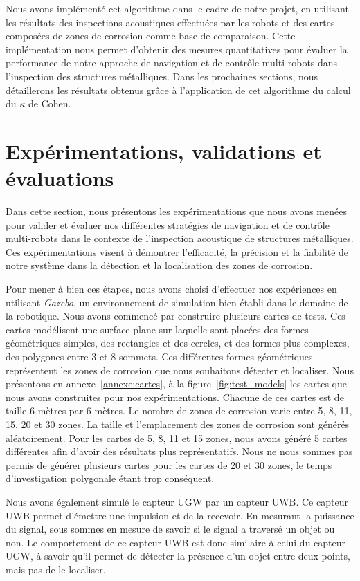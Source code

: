 \documentclass[francais,RandD]{rapportPFE}
\begin{document}
			Nous avons implémenté cet algorithme dans le cadre de notre projet, en utilisant les résultats des inspections acoustiques effectuées par les robots et des cartes composées de zones de corrosion comme base de comparaison.
			Cette implémentation nous permet d'obtenir des mesures quantitatives pour évaluer la performance de notre approche de navigation et de contrôle multi-robots dans l'inspection des structures métalliques.
			Dans les prochaines sections, nous détaillerons les résultats obtenus grâce à l'application de cet algorithme du calcul du $\kappa$ de Cohen.
	\section{Expérimentations, validations et évaluations}
		Dans cette section, nous présentons les expérimentations que nous avons menées pour valider et évaluer nos différentes stratégies de navigation et de contrôle multi-robots dans le contexte de l'inspection acoustique de structures métalliques.
		Ces expérimentations visent à démontrer l'efficacité, la précision et la fiabilité de notre système dans la détection et la localisation des zones de corrosion.

		Pour mener à bien ces étapes, nous avons choisi d'effectuer nos expériences en utilisant \textit{Gazebo}, un environnement de simulation bien établi dans le domaine de la robotique.
		Nous avons commencé par construire plusieurs cartes de tests.
		Ces cartes modélisent une surface plane sur laquelle sont placées des formes géométriques simples, des rectangles et des cercles, et des formes plus complexes, des polygones entre 3 et 8 sommets.
		Ces différentes formes géométriques représentent les zones de corrosion que nous souhaitons détecter et localiser.
		Nous présentons en annexe~\ref{annexe:cartes}, à la figure~\ref{fig:test_models} les cartes que nous avons construites pour nos expérimentations.
		Chacune de ces cartes est de taille 6 mètres par 6 mètres.
		Le nombre de zones de corrosion varie entre 5, 8, 11, 15, 20 et 30 zones.
		La taille et l'emplacement des zones de corrosion sont générés aléatoirement.
		Pour les cartes de 5, 8, 11 et 15 zones, nous avons généré 5 cartes différentes afin d'avoir des résultats plus représentatifs.
		Nous ne nous sommes pas permis de générer plusieurs cartes pour les cartes de 20 et 30 zones, le temps d'investigation polygonale étant trop conséquent.

		Nous avons également simulé le capteur UGW par un capteur UWB.
		Ce capteur UWB permet d'émettre une impulsion et de la recevoir.
		En mesurant la puissance du signal, sous sommes en mesure de savoir si le signal a traversé un objet ou non.
		Le comportement de ce capteur UWB est donc similaire à celui du capteur UGW, à savoir qu'il permet de détecter la présence d'un objet entre deux points, mais pas de le localiser.
\end{document}
